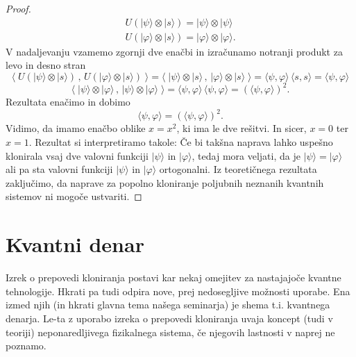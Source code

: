 \documentclass[12pt]{article}
\begin{document}
\begin{proof}
\begin{equation}
\begin{split}
U(| \psi \rangle \otimes | s \rangle) = | \psi \rangle \otimes | \psi \rangle
\\U(| \varphi \rangle \otimes | s \rangle) = | \varphi \rangle \otimes | \varphi \rangle.
\end{split}
\end{equation}
V nadaljevanju vzamemo zgornji dve enačbi in izračunamo notranji produkt za levo in desno stran
\begin{equation}
\langle \; U(| \psi \rangle \otimes | s \rangle) \, , \, U(| \varphi \rangle \otimes | s \rangle) \; \rangle = \langle \; | \psi \rangle \otimes | s \rangle \, , \, | \varphi \rangle \otimes | s \rangle \; \rangle = \langle \psi, \varphi \rangle \, \langle s, s \rangle = \langle \psi, \varphi \rangle
\end{equation}
\begin{equation}
\langle \; | \psi \rangle \otimes | \varphi \rangle \, , \, | \psi \rangle \otimes | \varphi \rangle \; \rangle = \langle \psi, \varphi \rangle \, \langle \psi, \varphi \rangle = \left( \langle \psi, \varphi \rangle \right)^2.
\end{equation}
Rezultata enačimo in dobimo
\begin{equation}
 \langle \psi, \varphi \rangle = \left( \langle \psi, \varphi \rangle \right)^2.
\end{equation}
Vidimo, da imamo enačbo oblike $x = x^2$, ki ima le dve rešitvi. In sicer, $x = 0$ ter $x = 1$. Rezultat si interpretiramo takole: Če bi takšna naprava lahko uspešno klonirala vsaj dve valovni funkciji $| \psi \rangle$ in $| \varphi \rangle$, tedaj mora veljati, da je $ | \psi \rangle = | \varphi \rangle$ ali pa sta valovni funkciji $| \psi \rangle$ in $| \varphi \rangle$ ortogonalni. Iz teoretičnega rezultata zaključimo, da naprave za popolno kloniranje poljubnih neznanih kvantnih sistemov ni mogoče ustvariti.
\end{proof}
 
\section{Kvantni denar} 

Izrek o prepovedi kloniranja postavi kar nekaj omejitev za nastajajoče kvantne tehnologije. Hkrati pa tudi odpira nove, prej nedosegljive možnosti uporabe. Ena izmed njih (in hkrati glavna tema našega seminarja) je shema t.i. kvantnega denarja. Le-ta z uporabo izreka o prepovedi kloniranja uvaja koncept (tudi v teoriji) neponaredljivega fizikalnega sistema, če njegovih lastnosti v naprej ne poznamo.
\end{document}
